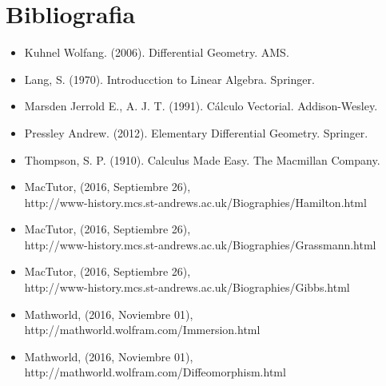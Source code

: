 
\section{Bibliografia}
\begin{itemize}
\item Kuhnel Wolfang. (2006). Differential Geometry. AMS.
\item Lang, S. (1970). Introducction to Linear Algebra. Springer. 
\item Marsden Jerrold E., A. J. T. (1991). Cálculo Vectorial. Addison-Wesley. 
\item Pressley Andrew. (2012). Elementary Differential Geometry. Springer. 
\item Thompson, S. P. (1910). Calculus Made Easy. The Macmillan Company. 
\item MacTutor, (2016, Septiembre 26), \\  http://www-history.mcs.st-andrews.ac.uk/Biographies/Hamilton.html
\item MacTutor, (2016, Septiembre 26), \\ http://www-history.mcs.st-andrews.ac.uk/Biographies/Grassmann.html
\item MacTutor, (2016, Septiembre 26), \\ http://www-history.mcs.st-andrews.ac.uk/Biographies/Gibbs.html
\item Mathworld, (2016, Noviembre 01), \\ http://mathworld.wolfram.com/Immersion.html 
\item Mathworld, (2016, Noviembre 01), \\ http://mathworld.wolfram.com/Diffeomorphism.html
\end{itemize}
